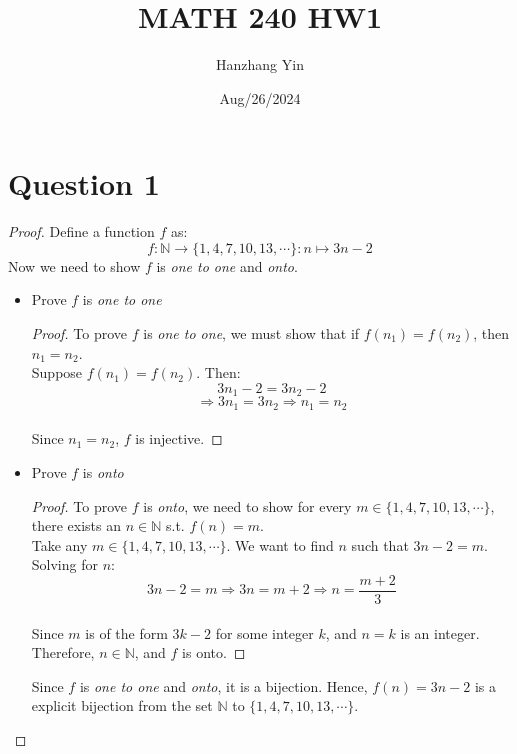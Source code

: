 \documentclass{article}
\title{MATH 240 HW1}
\author{Hanzhang Yin}
\date{Aug/26/2024}
\begin{document}
\maketitle

\section*{Question 1}
\begin{proof}
    Define a function $f$ as:
    \[ f: \mathbb{N} \rightarrow \{1,4,7,10,13,\cdots\}: n \mapsto 3n-2 \]
    Now we need to show $f$ is \textit{one to one} and \textit{onto}.
    \begin{itemize}
        \item Prove $f$ is \textit{one to one}
        \begin{proof}
            To prove $f$ is \textit{one to one}, we must show that if $f(n_1) = f(n_2)$, then $n_1 = n_2$.
            \\
            Suppose $f(n_1) = f(n_2)$. Then:
            \[ 3n_1 - 2 = 3n_2 - 2 \]
            \[ \Rightarrow 3n_1 = 3n_2 \Rightarrow n_1 = n_2\]
            \\
            Since $n_1 = n_2$, $f$ is injective.
        \end{proof}
        \item Prove $f$ is \textit{onto}
        \begin{proof}
            To prove $f$ is \textit{onto}, we need to show for every $m \in \{1,4,7,10,13,\cdots\}$, there exists an $n \in \mathbb{N}$ s.t. $f(n) = m$.
            \\
            Take any $m \in \{1,4,7,10,13,\cdots\}$. We want to find $n$ such that $3n-2 = m$. Solving for $n$:
            \[ 3n-2 = m \Rightarrow 3n = m + 2 \Rightarrow n = \frac{m+2}{3} \]
            \\
            Since $m$ is of the form $3k-2$ for some integer $k$, and $n=k$ is an integer. Therefore, $n \in \mathbb{N}$, and $f$ is onto.
        \end{proof}
        Since $f$ is \textit{one to one} and \textit{onto}, it is a bijection. Hence, $f(n) = 3n - 2$ is a explicit bijection from the set $\mathbb{N}$ to $\{1,4,7,10,13,\cdots\}$.
    \end{itemize}
\end{proof}
\end{document}
